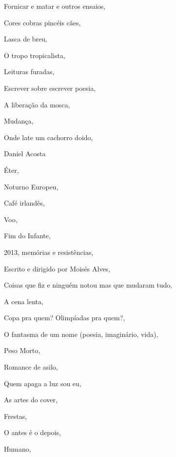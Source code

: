 \begin{multicols}{2}
\begin{enumerate}
{\item Fornicar e matar e outros ensaios, {}
\item Cores cobras pincéis cães, {}
\item Lasca de breu, {}
\item O tropo tropicalista, {}
\item Leituras furadas, {}
\item Escrever sobre escrever poesia, {}
\item A liberação da mosca, {}
\item Mudança, {}
\item Onde late um cachorro doido, {}
\item Daniel Acosta
\item Éter, {}
\item Noturno Europeu, {}
\item Café irlandês, {}
\item Voo, {}
\item Fim do Infante, {}
\item 2013, memórias e resistências, {}
\item Escrito e dirigido por Moisés Alves, {}
\item Coisas que fiz e ninguém notou mas que mudaram tudo, {}
\item A cena lenta, {}
\item Copa pra quem? Olimpíadas pra quem?, {}
\item O fantasma de um nome (poesia, imaginário, vida), {}
\item Peso Morto, {}
\item Romance de asilo, {}
\item Quem apaga a luz sou eu, {}
\item As artes do cover, {}
\item Frestas, {}
\item O antes é o depois, {}
\item Humano, {}
}
\end{enumerate}
\end{multicols}

\pagebreak
